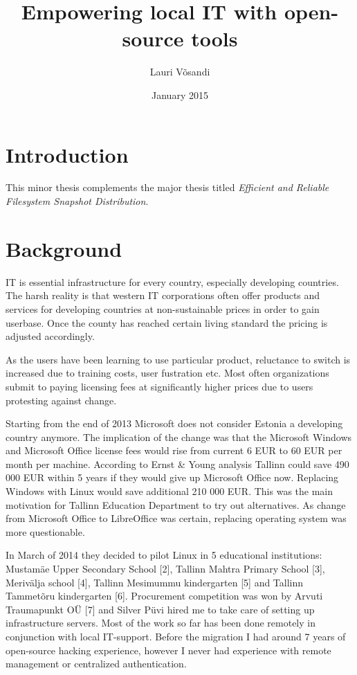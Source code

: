 \documentclass{article}
\title{Empowering local IT with open-source tools}
\author{Lauri Võsandi}
\date{January 2015}
\begin{document}
\maketitle

\section{Introduction}

This minor thesis complements the major thesis
titled \emph{Efficient and Reliable Filesystem Snapshot Distribution}.


\section{Background}

IT is essential infrastructure for every country, especially developing countries.
The harsh reality is that western IT corporations often offer products
and services for developing countries at non-sustainable prices in order
to gain userbase. Once the county has reached certain living standard the
pricing is adjusted accordingly.


As the users have been learning to use particular product,
reluctance to switch is increased due to training costs,
user fustration etc.
Most often organizations submit to paying licensing fees at significantly
higher prices due to users protesting against change.

Starting from the end of 2013 Microsoft does not consider Estonia a developing country
anymore. The implication of the change was that the Microsoft Windows and Microsoft
Office license fees would rise from current 6 EUR to 60 EUR per month per machine.
According to Ernst \& Young analysis Tallinn could save 490 000 EUR within 5 years
if they would give up Microsoft Office now. Replacing Windows with Linux would
save additional 210 000 EUR. This was the main motivation for Tallinn Education Department to try out alternatives. As change from Microsoft Office to LibreOffice was certain, replacing operating system was more questionable.

In March of 2014 they decided to pilot Linux in 5 educational institutions: Mustamäe Upper Secondary School [2], Tallinn Mahtra Primary School [3], Merivälja school [4], Tallinn Mesimummu kindergarten [5] and Tallinn Tammetõru kindergarten [6]. Procurement competition was won by Arvuti Traumapunkt OÜ [7] and Silver Püvi hired me to take care of setting up infrastructure servers. Most of the work so far has been done remotely in conjunction with local IT-support. Before the migration I had around 7 years of open-source hacking experience, however I never had experience with remote management or centralized authentication.
\end{document}
